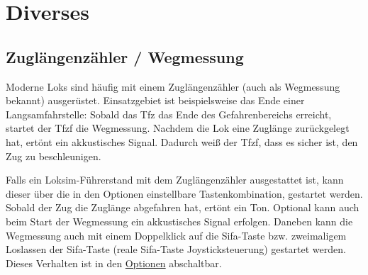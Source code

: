 \section{Diverses}
\label{sec.sim.steuerung.diverses}
\subsection{Zuglängenzähler / Wegmessung}
\label{sec.sim.steuerung.diverses.wegmessung}
Moderne Loks sind häufig mit einem Zuglängenzähler (auch als Wegmessung bekannt) ausgerüstet. Einsatzgebiet ist beispielsweise das Ende einer Langsamfahrstelle: Sobald das Tfz das Ende des Gefahrenbereichs erreicht, startet der Tfzf die Wegmessung. Nachdem die Lok eine Zuglänge zurückgelegt hat, ertönt ein akkustisches Signal. Dadurch weiß der Tfzf, dass es sicher ist, den Zug zu beschleunigen.

Falls ein Loksim-Führerstand mit dem Zuglängenzähler ausgestattet ist, kann dieser über die in den Optionen einstellbare Tastenkombination, gestartet werden. Sobald der Zug die Zuglänge abgefahren hat, ertönt ein Ton. Optional kann auch beim Start der Wegmessung ein akkustisches Signal erfolgen. Daneben kann die Wegmessung auch mit einem Doppelklick auf die Sifa-Taste bzw. zweimaligem Loslassen der Sifa-Taste (reale Sifa-Taste Joysticksteuerung) gestartet werden. Dieses Verhalten ist in den \hyperref[sec.sim.optionen.simulation]{Optionen} abschaltbar.